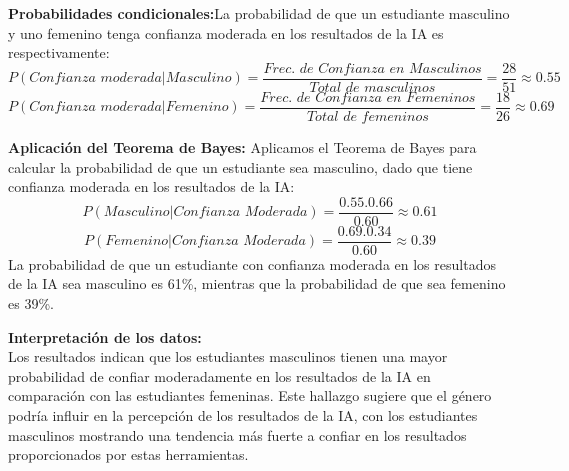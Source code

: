 \textbf{Probabilidades condicionales:}La probabilidad de que un estudiante masculino y uno femenino tenga confianza moderada en los resultados de la IA es respectivamente:
\begin{equation*}
	P(\textit{Confianza moderada|Masculino}) = \dfrac{\textit{Frec. de Confianza en Masculinos}}{\textit{Total de masculinos}} = \dfrac{28}{51} \approx 0.55
\end{equation*}
\begin{equation*}
	P(\textit{Confianza moderada|Femenino}) = \dfrac{\textit{Frec. de Confianza en Femeninos}}{\textit{Total de femeninos}} = \dfrac{18}{26} \approx 0.69
\end{equation*}

\textbf{Aplicación del Teorema de Bayes:} Aplicamos el Teorema de Bayes para calcular la probabilidad de que un estudiante sea masculino, dado que tiene confianza moderada en los resultados de la IA:
\begin{equation*}
	P(\textit{Masculino|Confianza Moderada}) = \dfrac{0.55 . 0.66}{0.60} \approx 0.61
\end{equation*}
\begin{equation*}
	P(\textit{Femenino|Confianza Moderada}) = \dfrac{0.69 . 0.34}{0.60} \approx 0.39
\end{equation*}
La probabilidad de que un estudiante con confianza moderada en los resultados de la IA sea masculino es 61\%, mientras que la probabilidad de que sea femenino es 39\%.

\textbf{Interpretación de los datos:}\\
Los resultados indican que los estudiantes masculinos tienen una mayor probabilidad de confiar moderadamente en los resultados de la IA en comparación con las estudiantes femeninas. Este hallazgo sugiere que el género podría influir en la percepción de los resultados de la IA, con los estudiantes masculinos mostrando una tendencia más fuerte a confiar en los resultados proporcionados por estas herramientas.